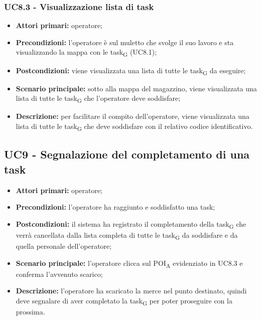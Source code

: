 \subsubsection{UC8.3 - Visualizzazione lista di task}
\begin{itemize}
	\item 	\textbf{Attori primari:} operatore;
	\item 	\textbf{Precondizioni:} l'operatore è sul muletto che svolge il suo lavoro e sta visualizzando la mappa con le \gls{task}\textsubscript{G} (UC8.1);
	\item 	\textbf{Postcondizioni:} viene visualizzata una lista di tutte le \gls{task}\textsubscript{G} da eseguire;
	\item 	\textbf{Scenario principale:} sotto alla mappa del magazzino, viene visualizzata una lista di tutte le \gls{task}\textsubscript{G} che l'operatore deve soddisfare;
	\item 	\textbf{Descrizione:} per facilitare il compito dell'operatore, viene visualizzata una lista di tutte le \gls{task}\textsubscript{G} che deve soddisfare con il relativo codice identificativo.
\end{itemize}

\subsection{UC9 - Segnalazione del completamento di una task}
\begin{itemize}
	\item 	\textbf{Attori primari:} operatore;
	\item 	\textbf{Precondizioni:} l'operatore ha raggiunto e soddisfatto una task;
	\item 	\textbf{Postcondizioni:} il sistema ha registrato il completamento della \gls{task}\textsubscript{G} che verrà cancellata dalla lista completa di tutte le \gls{task}\textsubscript{G} da soddisfare e da quella personale dell'operatore;
	\item 	\textbf{Scenario principale:} l'operatore clicca sul \acrshort{POI}\textsubscript{A} evidenziato in UC8.3 e conferma l'avvenuto scarico;
	\item 	\textbf{Descrizione:} l'operatore ha scaricato la merce nel punto destinato, quindi deve segnalare di aver completato la \gls{task}\textsubscript{G} per poter proseguire con la prossima.

\end{itemize}

